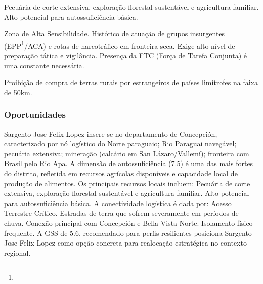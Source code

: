 \begin{description}[style=nextline,leftmargin=0.5cm,font=\bfseries]
\item[Recursos Locais]  Pecuária de corte extensiva, exploração florestal sustentável e agricultura familiar. Alto potencial para autossuficiência básica.
\item[Segurança]  Zona de Alta Sensibilidade. Histórico de atuação de grupos insurgentes (EPP\footnote{\fineEPP}/\allowbreak \allowbreak ACA) e rotas de narcotráfico em fronteira seca. Exige alto nível de preparação tática e vigilância. Presença da FTC (Força de Tarefa Conjunta) é uma constante necessária.
\item[Leis Local: Município relativamente novo (2011) com forte presença de cultura de fronteira. Restrição de Fronteira (Lei 2532/\allowbreak \allowbreak 05)]  Proibição de compra de terras rurais por estrangeiros de países limítrofes na faixa de 50km.
\end{description}
\newpage

\subsubsection*{Oportunidades}\label{oport-sargento-jose-felix-lopez-0109}
Sargento Jose Felix Lopez insere-se no departamento de Concepción, caracterizado por nó logístico do Norte paraguaio; Rio Paraguai navegável; pecuária extensiva; mineração (calcário em San Lázaro/Vallemí); fronteira com Brasil pelo Rio Apa. A dimensão de autossuficiência (7.5) é uma das mais fortes do distrito, refletida em recursos agrícolas disponíveis e capacidade local de produção de alimentos. Os principais recursos locais incluem: Pecuária de corte extensiva, exploração florestal sustentável e agricultura familiar. Alto potencial para autossuficiência básica. A conectividade logística é dada por: Acesso Terrestre Crítico. Estradas de terra que sofrem severamente em períodos de chuva. Conexão principal com Concepción e Bella Vista Norte. Isolamento físico frequente. A GSS de 5.6, recomendado para perfis resilientes posiciona Sargento Jose Felix Lopez como opção concreta para realocação estratégica no contexto regional.

